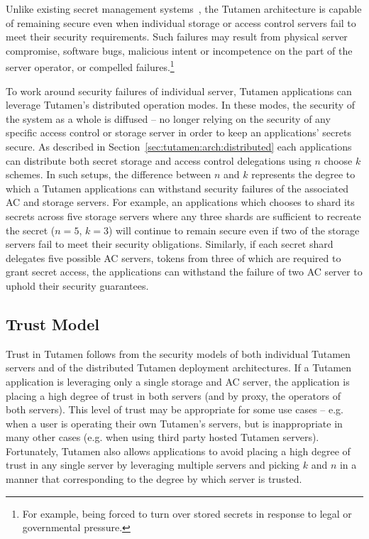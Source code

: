 Unlike existing secret management systems~\cite{vault, confidant,
  keywhiz}, the Tutamen architecture is capable of remaining secure
even when individual storage or access control servers fail to meet
their security requirements. Such failures may result from physical
server compromise, software bugs, malicious intent or incompetence on
the part of the server operator, or compelled failures.\footnote{For
  example, being forced to turn over stored secrets in response to
  legal or governmental pressure.}

To work around security failures of individual server, Tutamen
applications can leverage Tutamen's distributed operation modes. In
these modes, the security of the system as a whole is diffused -- no
longer relying on the security of any specific access control or
storage server in order to keep an applications' secrets secure. As
described in Section~\ref{sec:tutamen:arch:distributed} each
applications can distribute both secret storage and access control
delegations using $n$ choose $k$ schemes. In such setups, the
difference between $n$ and $k$ represents the degree to which a
Tutamen applications can withstand security failures of the associated
AC and storage servers. For example, an applications which chooses to
shard its secrets across five storage servers where any three shards
are sufficient to recreate the secret ($n=5$, $k=3$) will continue to
remain secure even if two of the storage servers fail to meet their
security obligations. Similarly, if each secret shard delegates five
possible AC servers, tokens from three of which are required to grant
secret access, the applications can withstand the failure of two AC
server to uphold their security guarantees.


\subsection{Trust Model}

Trust in Tutamen follows from the security models of both individual
Tutamen servers and of the distributed Tutamen deployment
architectures. If a Tutamen application is leveraging only a single
storage and AC server, the application is placing a high degree of
trust in both servers (and by proxy, the operators of both
servers). This level of trust may be appropriate for some use cases --
e.g. when a user is operating their own Tutamen's servers, but is
inappropriate in many other cases (e.g. when using third party hosted
Tutamen servers). Fortunately, Tutamen also allows applications to
avoid placing a high degree of trust in any single server by
leveraging multiple servers and picking $k$ and $n$ in a manner that
corresponding to the degree by which server is trusted.

